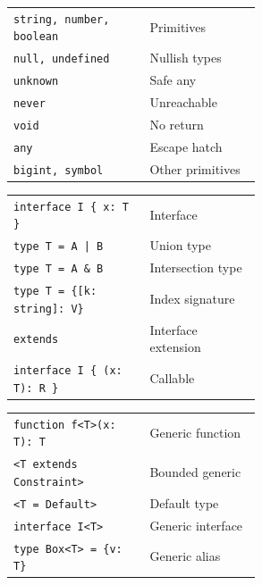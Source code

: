 \documentclass[10pt]{extarticle}
\begin{document}
\begin{multicols}{2}

\begin{tabularx}{\linewidth}{@{}>{\raggedright\arraybackslash}p{0.55\linewidth}@{\enspace}Y@{}}
\texttt{string, number, boolean}     & Primitives \\
\texttt{null, undefined}             & Nullish types \\
\texttt{unknown}                      & Safe any \\
\texttt{never}                        & Unreachable \\
\texttt{void}                         & No return \\
\texttt{any}                          & Escape hatch \\
\texttt{bigint, symbol}              & Other primitives \\
\end{tabularx}

\begin{tabularx}{\linewidth}{@{}>{\raggedright\arraybackslash}p{0.55\linewidth}@{\enspace}Y@{}}
\texttt{interface I \{ x: T \}}     & Interface \\
\texttt{type T = A | B}              & Union type \\
\texttt{type T = A \& B}             & Intersection type \\
\texttt{type T = \{[k: string]: V\}} & Index signature \\
\texttt{extends}                      & Interface extension \\
\texttt{interface I \{ (x: T): R \}} & Callable \\
\end{tabularx}

\begin{tabularx}{\linewidth}{@{}>{\raggedright\arraybackslash}p{0.55\linewidth}@{\enspace}Y@{}}
\texttt{function f<T>(x: T): T}     & Generic function \\
\texttt{<T extends Constraint>}     & Bounded generic \\
\texttt{<T = Default>}               & Default type \\
\texttt{interface I<T>}              & Generic interface \\
\texttt{type Box<T> = \{v: T\}}     & Generic alias \\
\end{tabularx}


\end{multicols}
\end{document}
